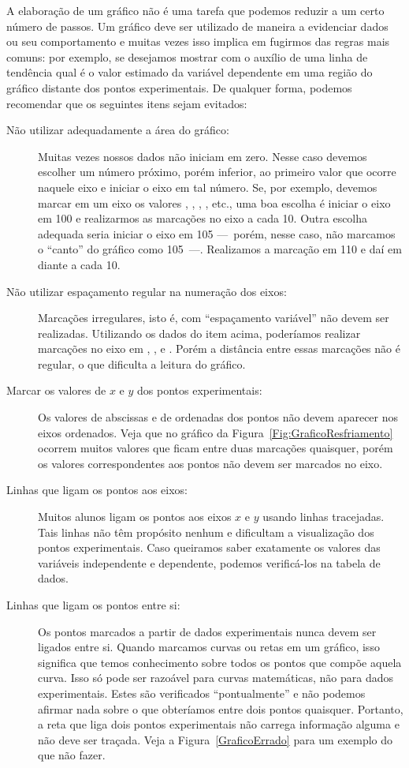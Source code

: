 A elaboração de um gráfico não é uma tarefa que podemos reduzir a um certo número de passos. Um gráfico deve ser utilizado de maneira a evidenciar dados ou seu comportamento e muitas vezes isso implica em fugirmos das regras mais comuns: por exemplo, se desejamos mostrar com o auxílio de uma linha de tendência qual é o valor estimado da variável dependente em uma região do gráfico distante dos pontos experimentais. De qualquer forma, podemos recomendar que os seguintes itens sejam evitados:
\begin{description}
	\item[Não utilizar adequadamente a área do gráfico:] Muitas vezes nossos dados não iniciam em zero. Nesse caso devemos escolher um número próximo, porém inferior, ao primeiro valor que ocorre naquele eixo e iniciar o eixo em tal número. Se, por exemplo, devemos marcar em um eixo os valores , , , , etc., uma boa escolha é iniciar o eixo em 100 e realizarmos as marcações no eixo a cada 10. Outra escolha adequada seria iniciar o eixo em 105 ---~porém, nesse caso, não marcamos o ``canto'' do gráfico como 105~---. Realizamos a marcação em 110 e daí em diante a cada 10.
	\item[Não utilizar espaçamento regular na numeração dos eixos:] Marcações irregulares, isto é, com ``espaçamento variável'' não devem ser realizadas. Utilizando os dados do item acima, poderíamos realizar marcações no eixo em , ,  e . Porém a distância entre essas marcações não é regular, o que dificulta a leitura do gráfico.
	\item[Marcar os valores de $x$ e $y$ dos pontos experimentais:] Os valores de abscissas e de ordenadas dos pontos não devem aparecer nos eixos ordenados. Veja que no gráfico da Figura~\ref{Fig:GraficoResfriamento} ocorrem muitos valores que ficam entre duas marcações quaisquer, porém os valores correspondentes aos pontos não devem ser marcados no eixo.
	\item[Linhas que ligam os pontos aos eixos:] Muitos alunos ligam os pontos aos eixos $x$ e $y$ usando linhas tracejadas. Tais linhas não têm propósito nenhum e dificultam a visualização dos pontos experimentais. Caso queiramos saber exatamente os valores das variáveis independente e dependente, podemos verificá-los na tabela de dados.
	\item[Linhas que ligam os pontos entre si:] Os pontos marcados a partir de dados experimentais nunca devem ser ligados entre si. Quando marcamos curvas ou retas em um gráfico, isso significa que temos conhecimento sobre todos os pontos que compõe aquela curva. Isso só pode ser razoável para curvas matemáticas, não para dados experimentais. Estes são verificados ``pontualmente'' e não podemos afirmar nada sobre o que obteríamos entre dois pontos quaisquer. Portanto, a reta que liga dois pontos experimentais não carrega informação alguma e não deve ser traçada. Veja a Figura~\ref{GraficoErrado} para um exemplo do que não fazer.
\end{description}

